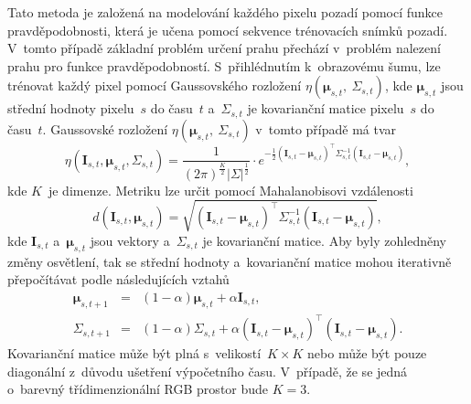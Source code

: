 \par{Tato metoda je založená na modelování každého pixelu pozadí pomocí funkce pravdě\-po\-do\-bno\-sti, která je učena pomocí sekvence trénovacích snímků pozadí. V~tomto případě základní problém určení prahu přechází v~problém nalezení prahu pro funkce pra\-vdě\-po\-do\-bno\-stí. S~přihlédnutím k~obrazovému šumu, lze trénovat každý pixel pomocí Gaussovského rozložení $\eta \left( \bm{\mu}_{s,t},~ \Sigma_{s,t} \right)$, kde $\bm{\mu}_{s,t}$ jsou střední hodnoty pixelu~$s$ do času~$t$ a~$\Sigma_{s,t}$ je kovarianční matice pixelu~$s$ do času~$t$. Gaussovské rozložení $\eta \left( \bm{\mu}_{s,t},~ \Sigma_{s,t} \right)$ v~tomto případě má tvar
\begin{equation}
	\eta \left( \bm{I}_{s, t}, \bm{\mu}_{s, t}, \Sigma_{s, t} \right) = \frac{1}{\left( 2 \pi \right)^{\frac{K}{2}} |\Sigma |^{\frac{1}{2}}} \cdot e^{-\frac{1}{2} \left( \bm{I}_{s, t} - \bm{\mu}_{s, t} \right)^{\top} \Sigma_{s, t}^{-1} \left( \bm{I}_{s, t} - \bm{\mu}_{s, t} \right) },
\end{equation}
kde $K$~je dimenze. Metriku lze určit pomocí Mahalanobisovi vzdálenosti
\begin{equation}
	d \left( \bm{I}_{s, t}, \bm{\mu}_{s, t} \right) = \sqrt{ \left( \bm{I}_{s, t} - \bm{\mu}_{s, t} \right)^{\top} \Sigma_{s, t}^{-1} \left( \bm{I}_{s, t} - \bm{\mu}_{s, t}\right) } ,
\end{equation}
kde $\bm{I}_{s,t}$ a~$\bm{\mu}_{s,t}$ jsou vektory a~$\Sigma_{s,t}$ je kovarianční matice. Aby byly zohledněny změny osvětlení, tak se střední hodnoty a~kovarianční matice mohou iterativně přepočítávat podle následujících vztahů
\begin{eqnarray}
	\bm{\mu}_{s, t + 1} &= &\left( 1 - \alpha \right) \bm{\mu}_{s, t} + \alpha \bm{I}_{s, t}, \\
	\Sigma_{s, t + 1} &= &\left( 1 - \alpha \right) \Sigma_{s, t} + \alpha \left( \bm{I}_{s, t} - \bm{\mu}_{s, t} \right)^{\top} \left( \bm{I}_{s, t} - \bm{\mu}_{s, t} \right).
\end{eqnarray}
Kovarianční matice může být plná s~velikostí~$K \times K$ nebo může být pouze diago\-nální z~důvodu ušetření výpočetního času. V~případě, že se jedná o~barevný tří\-dimenzio\-nální RGB prostor bude $K = 3$.}






\newpage






